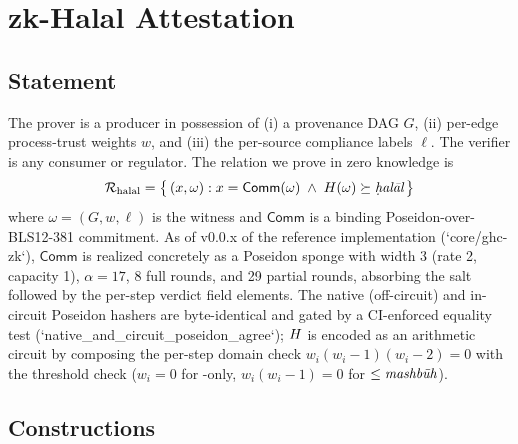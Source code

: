 \section{zk-Halal Attestation}
\label{sec:zkhalal}

\subsection{Statement}

The prover is a producer in possession of (i) a provenance DAG $G$,
(ii) per-edge process-trust weights $w$, and (iii) the per-source
compliance labels $\ell$. The verifier is any consumer or regulator.
The relation we prove in zero knowledge is
\[
  \mathcal{R}_{\mathrm{halal}} = \bigl\{\,
     (x, \omega) :
        x = \mathsf{Comm}(\omega) \;\wedge\;
        \HCF(\omega) \succeq \halal
  \,\bigr\}
\]
where $\omega = (G, w, \ell)$ is the witness and $\mathsf{Comm}$ is a
binding Poseidon-over-BLS12-381 commitment. As of v0.0.x of the
reference implementation (`core/ghc-zk`), $\mathsf{Comm}$ is
realized concretely as a Poseidon sponge with width 3 (rate 2,
capacity 1), $\alpha = 17$, 8 full rounds, and 29 partial rounds,
absorbing the salt followed by the per-step verdict field elements.
The native (off-circuit) and in-circuit Poseidon hashers are
byte-identical and gated by a CI-enforced equality test
(`native\_and\_circuit\_poseidon\_agree`); $\HCF$ is encoded as an
arithmetic circuit by composing the per-step domain check
$w_i (w_i - 1)(w_i - 2) = 0$ with the threshold check
($w_i = 0$ for \halal-only, $w_i (w_i - 1) = 0$ for $\leq \mashbuh$).

\subsection{Constructions}

